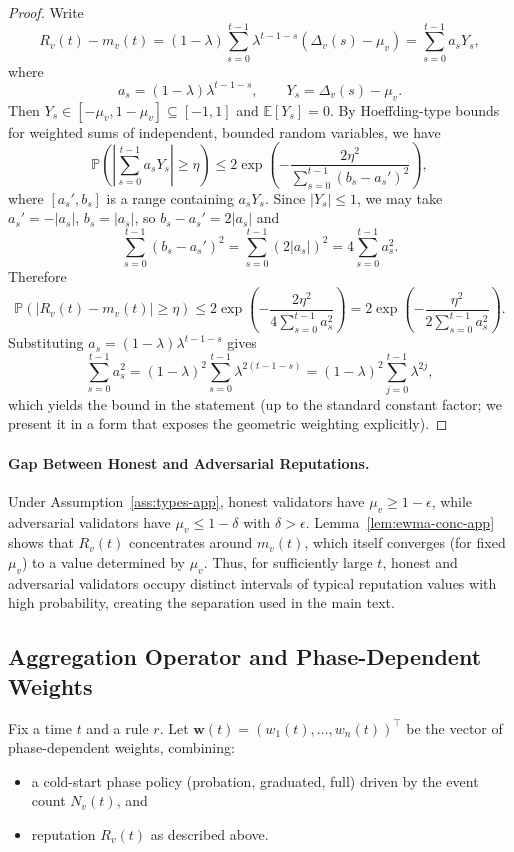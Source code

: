 \documentclass[11pt]{article}
\begin{document}
\begin{proof}
Write
\[
R_v(t) - m_v(t)
= (1-\lambda)\sum_{s=0}^{t-1}\lambda^{t-1-s}(\Delta_v(s) - \mu_v)
= \sum_{s=0}^{t-1} a_s Y_s,
\]
where
\[
a_s = (1-\lambda)\lambda^{t-1-s}, \qquad
Y_s = \Delta_v(s) - \mu_v.
\]
Then \(Y_s \in [-\mu_v,1-\mu_v] \subseteq [-1,1]\) and \(\mathbb{E}[Y_s]=0\). By Hoeffding-type bounds for weighted sums of independent, bounded random variables, we have
\[
\mathbb{P}\left(\left|\sum_{s=0}^{t-1} a_s Y_s\right| \ge \eta\right)
\le 2\exp\left(
  -\frac{2\eta^2}{\sum_{s=0}^{t-1}(b_s - a_s')^2}
\right),
\]
where \([a_s',b_s]\) is a range containing \(a_sY_s\). Since \(|Y_s|\le 1\), we may take \(a_s'=-|a_s|\), \(b_s=|a_s|\), so \(b_s-a_s'=2|a_s|\) and
\[
\sum_{s=0}^{t-1}(b_s - a_s')^2
= \sum_{s=0}^{t-1}(2|a_s|)^2
= 4\sum_{s=0}^{t-1} a_s^2.
\]
Therefore
\[
\mathbb{P}(|R_v(t) - m_v(t)| \ge \eta)
\le 2 \exp\left(
  -\frac{2\eta^2}{4\sum_{s=0}^{t-1} a_s^2}
\right)
= 2\exp\left(
  -\frac{\eta^2}{2\sum_{s=0}^{t-1} a_s^2}
\right).
\]
Substituting \(a_s = (1-\lambda)\lambda^{t-1-s}\) gives
\[
\sum_{s=0}^{t-1} a_s^2
= (1-\lambda)^2\sum_{s=0}^{t-1}\lambda^{2(t-1-s)}
= (1-\lambda)^2\sum_{j=0}^{t-1}\lambda^{2j},
\]
which yields the bound in the statement (up to the standard constant factor; we present it in a form that exposes the geometric weighting explicitly).
\end{proof}

\paragraph{Gap Between Honest and Adversarial Reputations.}
Under Assumption~\ref{ass:types-app}, honest validators have \(\mu_v \ge 1-\epsilon\), while adversarial validators have \(\mu_v \le 1-\delta\) with \(\delta > \epsilon\). Lemma~\ref{lem:ewma-conc-app} shows that \(R_v(t)\) concentrates around \(m_v(t)\), which itself converges (for fixed \(\mu_v\)) to a value determined by \(\mu_v\). Thus, for sufficiently large \(t\), honest and adversarial validators occupy distinct intervals of typical reputation values with high probability, creating the separation used in the main text.

\subsection{Aggregation Operator and Phase-Dependent Weights}

Fix a time \(t\) and a rule \(r\). Let \(\bm{w}(t) = (w_1(t),\dots,w_n(t))^\top\) be the vector of phase-dependent weights, combining:
\begin{itemize}[leftmargin=*]
  \item a cold-start phase policy (probation, graduated, full) driven by the event count \(N_v(t)\), and
  \item reputation \(R_v(t)\) as described above.
\end{itemize}
\end{document}
